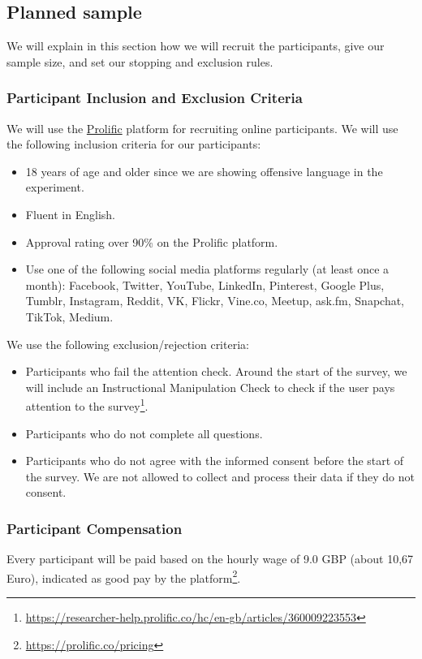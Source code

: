 \documentclass[a4paper]{article}
\begin{document}
\subsection{Planned sample}
We will explain in this section how we will recruit the participants, give our sample size, and set our stopping and exclusion rules.

\subsubsection{Participant Inclusion and Exclusion Criteria}
We will use the \href{https://prolific.co}{Prolific} platform for recruiting online participants. We will use the following inclusion criteria for our participants:
\begin{itemize}
    \item 18 years of age and older since we are showing offensive language in the experiment.
    \item Fluent in English.
    \item Approval rating over 90\% on the Prolific platform.
    \item Use one of the following social media platforms regularly (at least once a month): Facebook, Twitter, YouTube, LinkedIn, Pinterest, Google Plus, Tumblr, Instagram, Reddit, VK, Flickr, Vine.co, Meetup, ask.fm, Snapchat, TikTok, Medium.
\end{itemize}

We use the following exclusion/rejection criteria:
\begin{itemize}
    \item Participants who fail the attention check. Around the start of the survey, we will include an Instructional Manipulation Check to check if the user pays attention to the survey\footnote{\url{https://researcher-help.prolific.co/hc/en-gb/articles/360009223553}}.
    \item Participants who do not complete all questions.
    \item Participants who do not agree with the informed consent before the start of the survey. We are not allowed to collect and process their data if they do not consent.
\end{itemize}

\subsubsection{Participant Compensation}
Every participant will be paid based on the hourly wage of 9.0 GBP (about 10,67 Euro), indicated as good pay by the platform\footnote{\url{https://prolific.co/pricing}}.
\end{document}
